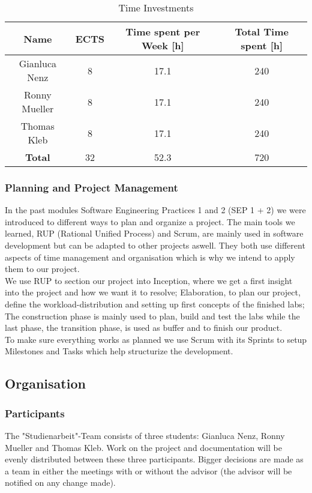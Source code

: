 \begin{table}
    \centering
    \begin{tabular}{||c c c c||} 
        \hline
        Name & ECTS & Time spent per Week [h] & Total Time spent [h]\\ [0.5ex] 
        \hline\hline
        Gianluca Nenz & 8 & 17.1 & 240 \\ 
        \hline
        Ronny Mueller & 8 & 17.1 & 240 \\
        \hline
        Thomas Kleb & 8 & 17.1 & 240 \\ 
        \hline
        \textbf{Total} & 32 & 52.3 & 720 \\[1ex] 
        \hline
    \end{tabular}
    \caption{Time Investments}
    \label{time_ects}
\end{table}

\subsubsection*{Planning and Project Management}
In the past modules Software Engineering Practices 1 and 2 (SEP 1 + 2) we were introduced to different ways to plan and organize a project. The main tools we learned, RUP (Rational Unified Process) and Scrum, are mainly used in software development but can be adapted to other projects aswell. They both use different aspects of time management and organisation which is why we intend to apply them to our project. \\
We use RUP to section our project into Inception, where we get a first insight into the project and how we want it to resolve; Elaboration, to plan our project, define the workload-distribution and setting up first concepts of the finished labs; The construction phase is mainly used to plan, build and test the labs while the last phase, the transition phase, is used as buffer and to finish our product. \\ 
To make sure everything works as planned we use Scrum with its Sprints to setup Milestones and Tasks which help structurize the development. 

\subsection{Organisation}

\subsubsection*{Participants}
The "Studienarbeit"-Team consists of three students: Gianluca Nenz, Ronny Muel\-ler and Thomas Kleb. Work on the project and documentation will be evenly distributed between these three participants. Bigger decisions are made as a team in either the meetings with or without the advisor (the advisor will be notified on any change made).

